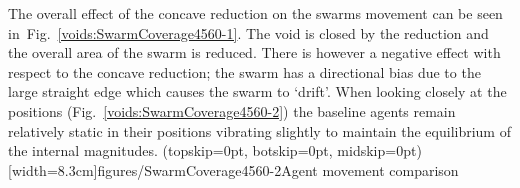 \documentclass{ieeeaccess}
\begin{document}
The overall effect of the concave reduction on the swarms movement can be seen in~Fig.~\ref{voids:SwarmCoverage4560-1}. The void is closed by the reduction and the overall area of the swarm is reduced. There is however a negative effect with respect to the concave reduction; the swarm has a directional bias due to the large straight edge which causes the swarm to `drift'. When looking closely at the positions (Fig.~\ref{voids:SwarmCoverage4560-2}) the baseline agents remain relatively static in their positions vibrating slightly to maintain the equilibrium of the internal magnitudes. 
\Figure[t!](topskip=0pt, botskip=0pt, midskip=0pt)[width=8.3cm]{figures/SwarmCoverage4560-2}{Agent movement comparison\label{voids:SwarmCoverage4560-2}}
\end{document}
